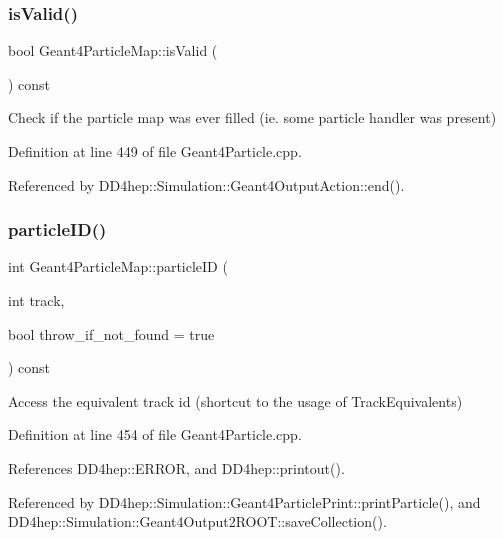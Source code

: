 \subsubsection{\texorpdfstring{is\+Valid()}{isValid()}}
{\footnotesize\ttfamily bool Geant4\+Particle\+Map\+::is\+Valid (\begin{DoxyParamCaption}{ }\end{DoxyParamCaption}) const}



Check if the particle map was ever filled (ie. some particle handler was present) 



Definition at line 449 of file Geant4\+Particle.\+cpp.



Referenced by D\+D4hep\+::\+Simulation\+::\+Geant4\+Output\+Action\+::end().

\hypertarget{class_d_d4hep_1_1_simulation_1_1_geant4_particle_map_a25f6e10e268cd67d7bcc99eb71d095ba}{}\label{class_d_d4hep_1_1_simulation_1_1_geant4_particle_map_a25f6e10e268cd67d7bcc99eb71d095ba} 
\subsubsection{\texorpdfstring{particle\+I\+D()}{particleID()}}
{\footnotesize\ttfamily int Geant4\+Particle\+Map\+::particle\+ID (\begin{DoxyParamCaption}\item[{int}]{track,  }\item[{bool}]{throw\+\_\+if\+\_\+not\+\_\+found = {\ttfamily true} }\end{DoxyParamCaption}) const}



Access the equivalent track id (shortcut to the usage of Track\+Equivalents) 



Definition at line 454 of file Geant4\+Particle.\+cpp.



References D\+D4hep\+::\+E\+R\+R\+OR, and D\+D4hep\+::printout().



Referenced by D\+D4hep\+::\+Simulation\+::\+Geant4\+Particle\+Print\+::print\+Particle(), and D\+D4hep\+::\+Simulation\+::\+Geant4\+Output2\+R\+O\+O\+T\+::save\+Collection().

